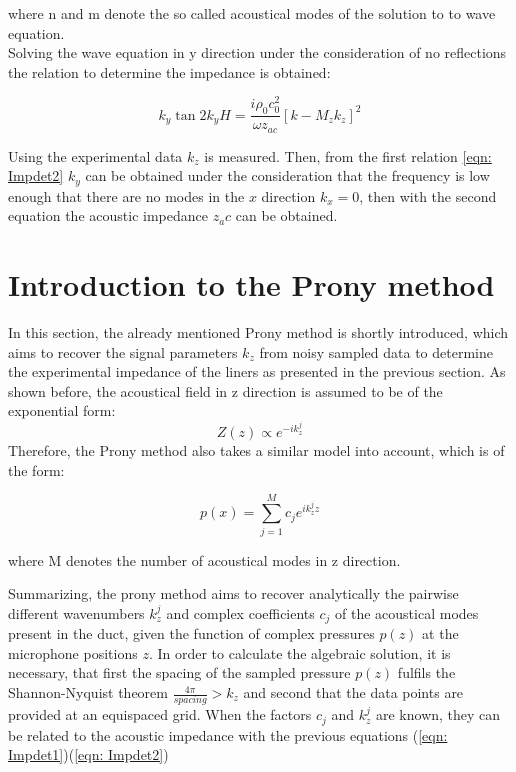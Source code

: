 \documentclass[11pt]{report} %
\begin{document}
where n and m denote the so called acoustical modes of the solution to to wave equation.\\
Solving the wave equation in y direction under the consideration of no reflections the relation to determine the impedance is obtained: 

\begin{equation}\label{eqn: Impdet1}
    k_y \tan 2k_y H = \frac{i \rho_0 c_0^2}{\omega z_{ac}} \left[k-M_zk_z\right]^2
\end{equation}

Using the experimental data $k_z$ is measured. 
Then, from the first relation \ref{eqn: Impdet2} $k_y$ can be obtained under the consideration that the frequency is low enough that there are no modes in the $x$ direction $k_x = 0$, then with the second equation the acoustic impedance $z_ac$ can be obtained.

\section{Introduction to the Prony method}

In this section, the already mentioned Prony method is shortly introduced, which aims to recover the signal parameters $k_z$ from noisy sampled data to determine the experimental impedance of the liners as presented in the previous section.
As shown before, the acoustical field in z direction is assumed to be of the exponential form:
\begin{equation}
Z(z)\propto e^{-ik_z^j}
\end{equation} 
Therefore, the Prony method also takes a similar model into account, which is of the form: 

\begin{equation}\label{eqn: expsum}
 p(x)=\sum\limits_{j=1}^M c_{j}e^{ik_z^jz} 
\end{equation}

where M denotes the number of acoustical modes in z direction. 

Summarizing, the prony method aims to recover analytically the pairwise different wavenumbers $k_z^{j}$ and complex coefficients $c_{j}$ of the acoustical modes present in the duct, given the function of complex pressures $p(z)$ at the microphone positions $z$.
In order to calculate the algebraic solution, it is necessary, that first the spacing of the sampled pressure $p(z)$ fulfils the Shannon-Nyquist theorem $\frac{4\pi}{spacing}>k_z$ and second that the data points are provided at an equispaced grid.
When the factors $c_j$ and $k_z^j$ are known, they can be related to the acoustic impedance with the previous equations (\ref{eqn: Impdet1})(\ref{eqn: Impdet2})
 
\end{document}
